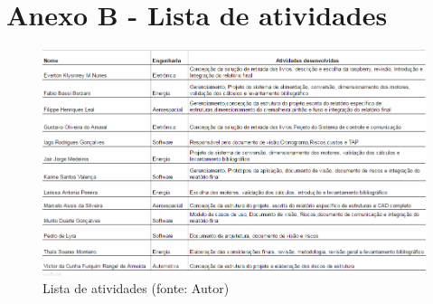 \section{Anexo B - Lista de atividades}

\begin{figure}[!h]
\centering
\includegraphics[scale=0.65, angle = 360]{figuras/lista_atividades}
\caption[]{Lista de atividades (fonte: Autor)}
\end{figure}
\FloatBarrier